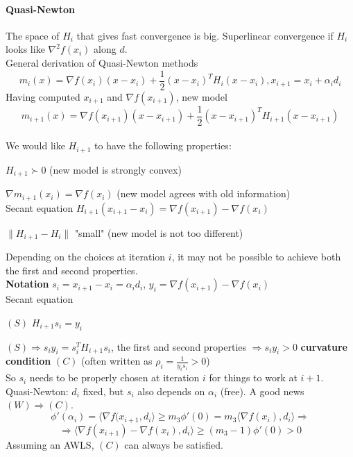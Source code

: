 \documentclass[10pt]{report}
\begin{document}
\paragraph{Quasi-Newton} The space of $H_i$ that gives fast convergence is big. Superlinear convergence if $H_i$ looks like $\nabla^2 f(x_i)$ along $d$.\\
General derivation of Quasi-Newton methods $$m_i(x) = \nabla f(x_i)(x-x_i)+\frac{1}{2}(x-x_i)^TH_i(x-x_i), x_{i+1} = x_i+\alpha_id_i$$
Having computed $x_{i+1}$ and $\nabla f(x_{i+1})$, new model
$$m_{i+1}(x) = \nabla f(x_{i+1})(x-x_{i+1})+\frac{1}{2}(x-x_{i+1})^TH_{i+1}(x-x_{i+1})$$\\
We would like $H_{i+1}$ to have the following properties:
\begin{list}{}{}
	\item $H_{i+1}\succ 0$ (new model is strongly convex)
	\item $\nabla m_{i+1}(x_i) = \nabla f(x_i)$ (new model agrees with old information)\\
	Secant equation $H_{i+1}(x_{i+1}-x_i)=\nabla f(x_{i+1})-\nabla f(x_i)$
	\item $\|H_{i+1} - H_i\|$ "small" (new model is not too different)
\end{list}
Depending on the choices at iteration $i$, it may not be possible to achieve both the first and second properties.\\
\textbf{Notation} $s_i = x_{i+1}- x_i = \alpha_id_i$, $y_i = \nabla f(x_{i+1}) -\nabla f(x_i)$\\
Secant equation 
\begin{list}{}{}
	\item[$(S)$] $H_{i+1}s_i = y_i$
\end{list}
$(S)\Rightarrow s_iy_i = s_i^TH_{i+1}s_i$, the first and second properties $\Rightarrow s_iy_i > 0$ \textbf{curvature condition} $(C)$ (often written as $\rho_i = \frac{1}{y_is_i} > 0$)\\
So $s_i$ needs to be properly chosen at iteration $i$ for things to work at $i+1$.\\
Quasi-Newton: $d_i$ fixed, but $s_i$ also depends on $\alpha_i$ (free). A good news $(W)\Rightarrow (C)$.
$$\phi'(\alpha_i)=\langle\nabla f(x_{i+1},d_i\rangle\geq m_3\phi'(0)=m_3\langle\nabla f(x_i), d_i\rangle\Rightarrow$$
$$\Rightarrow \langle\nabla f(x_{i+1})-\nabla f(x_i),d_i\rangle\geq (m_3-1)\phi'(0)> 0$$
Assuming an AWLS, $(C)$ can always be satisfied.
\end{document}
